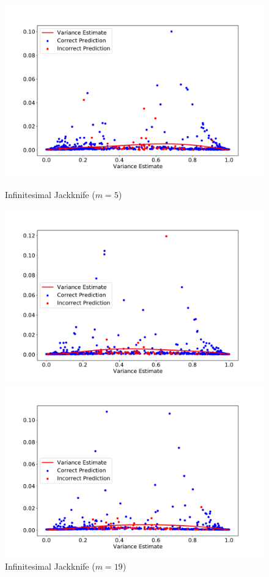 \documentclass[11pt]{article}
\begin{document}
\begin{figure}[htbp]
	\centering
	\begin{minipage}{0.6\textwidth}
	\includegraphics[width=1\textwidth]{../figures/figure4(1)0.pdf}
	\caption{Infinitesimal Jackknife ($m=5$)}
	\label{fig:figeure4_0}
	\end{minipage}
	\begin{minipage}{0.6\textwidth}
	\centering	
	\includegraphics[width=1\textwidth]{../figures/figure4(1)1.pdf}
	\caption{Infinitesimal Jackknife ($m=19$)}
	\label{fig:figeure4_1}
	\end{minipage}
	\begin{minipage}{0.6\textwidth}
	\centering	
	\includegraphics[width=1\textwidth]{../figures/figure4(1)2.pdf}

\end{minipage}
\end{figure}
\end{document}
